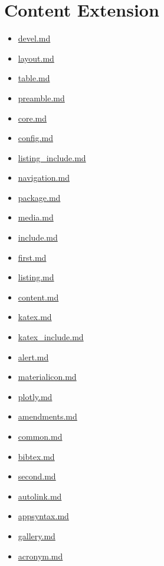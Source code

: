 
\chapter{\label{content-extension}Content Extension}
\begin{itemize}
\item\href{devel.tex}{devel.md}\item\href{layout.tex}{layout.md}\item\href{table.tex}{table.md}\item\href{preamble.tex}{preamble.md}\item\href{core.tex}{core.md}\item\href{config.tex}{config.md}\item\href{listing\_include.tex}{listing\_include.md}\item\href{navigation.tex}{navigation.md}\item\href{package.tex}{package.md}\item\href{media.tex}{media.md}\item\href{include.tex}{include.md}\item\href{first.tex}{first.md}\item\href{listing.tex}{listing.md}\item\href{content.tex}{content.md}\item\href{katex.tex}{katex.md}\item\href{katex\_include.tex}{katex\_include.md}\item\href{alert.tex}{alert.md}\item\href{materialicon.tex}{materialicon.md}\item\href{plotly.tex}{plotly.md}\item\href{amendments.tex}{amendments.md}\item\href{common.tex}{common.md}\item\href{bibtex.tex}{bibtex.md}\item\href{second.tex}{second.md}\item\href{autolink.tex}{autolink.md}\item\href{appsyntax.tex}{appsyntax.md}\item\href{gallery.tex}{gallery.md}\item\href{acronym.tex}{acronym.md}
\end{itemize}